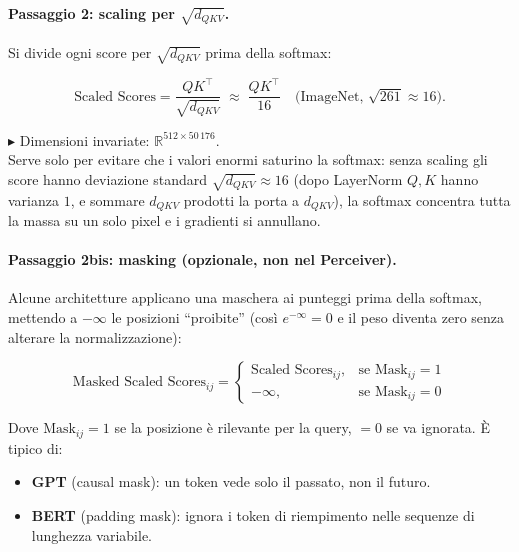 \documentclass[
  11pt,
]{article}
\begin{document}
\paragraph{Passaggio 2: scaling per $\sqrt{d_{QKV}}$.} Si divide ogni score per $\sqrt{d_{QKV}}$ prima della softmax:

\begin{formulabox}[title={\textbf{Scaled Scores}}]
\[
\text{Scaled Scores} = \frac{QK^\top}{\sqrt{d_{QKV}}} \;\approx\; \frac{QK^\top}{16} \quad \text{(ImageNet, $\sqrt{261}\approx 16$)}.
\]
\end{formulabox}

$\blacktriangleright$ Dimensioni invariate: $\mathbb{R}^{512\times 50\,176}$. \\
Serve solo per evitare che i valori enormi saturino la softmax: senza scaling gli score hanno deviazione standard $\sqrt{d_{QKV}}\approx 16$ (dopo LayerNorm $Q,K$ hanno varianza $1$, e sommare $d_{QKV}$ prodotti la porta a $d_{QKV}$), la softmax concentra tutta la massa su un solo pixel e i gradienti si annullano.

\paragraph{Passaggio 2bis: masking (opzionale, non nel Perceiver).} Alcune architetture applicano una maschera ai punteggi prima della softmax, mettendo a $-\infty$ le posizioni ``proibite'' (così $e^{-\infty}=0$ e il peso diventa zero senza alterare la normalizzazione):

\begin{formulabox}[title={\textbf{Masking}}]
\[
\text{Masked Scaled Scores}_{ij} = \begin{cases}
\text{Scaled Scores}_{ij}, & \text{se } \mathrm{Mask}_{ij} = 1 \\
-\infty, & \text{se } \mathrm{Mask}_{ij} = 0
\end{cases}
\]
\end{formulabox}

Dove $\mathrm{Mask}_{ij}=1$ se la posizione è rilevante per la query, $=0$ se va ignorata. È tipico di:

\begin{itemize}\setlength\itemsep{0.15em}
\item \textbf{GPT} (causal mask): un token vede solo il passato, non il futuro.
\item \textbf{BERT} (padding mask): ignora i token di riempimento nelle sequenze di lunghezza variabile.
\end{itemize}
\end{document}
